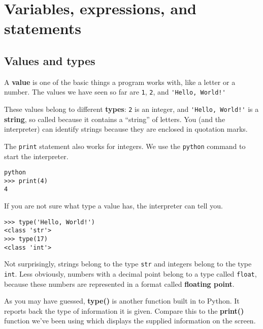 

\chapter{Variables, expressions, and statements}

\section{Values and types}

A {\bf value} is one of the basic things a program works with,
like a letter or a
number.  The values we have seen so far
are {\tt 1}, {\tt 2}, and
\verb"'Hello, World!'"

These values belong to different {\bf types}:
{\tt 2} is an integer, and \verb"'Hello, World!'" is a {\bf string},
so called because it contains a ``string'' of letters.
You (and the interpreter) can identify
strings because they are enclosed in quotation marks.


The {\tt print} statement also works for integers.  We use the 
{\tt python} command to start the interpreter.

\beforeverb
\begin{verbatim}
python
>>> print(4)
4
\end{verbatim}
\afterverb
%
If you are not sure what type a value has, the interpreter can tell you.

\beforeverb
\begin{verbatim}
>>> type('Hello, World!')
<class 'str'>
>>> type(17)
<class 'int'>
\end{verbatim}
\afterverb
%
Not surprisingly, strings belong to the type {\tt str} and
integers belong to the type {\tt int}.  Less obviously, numbers
with a decimal point belong to a type called {\tt float},
because these numbers are represented in a
format called {\bf floating point}.


As you may have guessed, {\bf type()} is another function built in to Python. It reports back the type of information it is given. Compare this to the {\bf print()} function we've been using which displays the supplied information on the screen.

